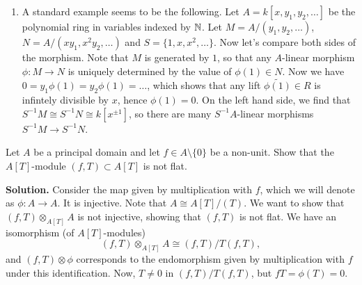 \documentclass[a4paper,11pt]{article}
\begin{document}
\begin{enumerate}
\item A standard example seems to be the following. Let $A = k[x, y_1, y_2, \dots]$ be 
    the polynomial ring in variables indexed by $\mathbb{N}$. Let $M = A / (y_1, y_2, \dots)$,
    $N = A/(xy_1, x^2y_2, \dots)$ and $S = \{1,x,x^2,\dots\}$. Now let's compare both 
    sides of the morphism. Note that $M$ is generated by $1$, so that any
    $A$-linear morphism $\phi: M \to N$ is uniquely determined by the value of
    $\phi(1) \in N$. Now we have $0 = y_1 \phi(1) = y_2 \phi(1) = \dots$, which shows
    that any lift $\tilde{\phi(1)} \in R$ is infintely divisible by $x$, hence 
    $\phi(1) = 0$. On the left hand side, we find that
    $S^{-1} M \cong S^{-1}N \cong k[x^{\pm 1}]$, so there are many $S^{-1}A$-linear
    morphisms $S^{-1} M \to S^{-1}N$. 
\end{enumerate}

Let $A$ be a principal domain and let $f \in A \setminus \{0\}$ be a 
non-unit. Show that the $A[T]$-module $(f,T) \subset A[T]$ is not flat. 

\textbf{Solution.}
Consider the map given by multiplication with $f$, which we will 
denote as $\phi: A \to A$. It is injective. Note that $A \cong A[T]/(T)$. 
We want to show that $(f,T) \otimes_{A[T]} A$ is not injective, 
showing that $(f,T)$ is not flat. We have an isomorphism (of $A[T]$-modules)
$$(f,T) \otimes_{A[T]} A \cong (f,T) / T (f,T),$$
and $(f,T) \otimes \phi$ corresponds to the endomorphism given by multiplication
with $f$ under this identification.
Now, $T \neq 0$ in $(f,T)/T(f,T)$, but $fT = \phi(T) = 0$. 
\end{document}
